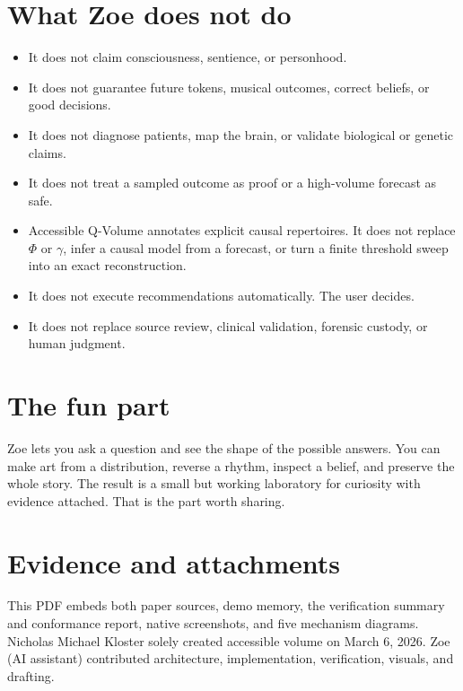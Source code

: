 \documentclass[11pt,a4paper]{article}
\begin{document}
\section{What Zoe does not do}
\begin{itemize}[nosep]
  \item It does not claim consciousness, sentience, or personhood.
  \item It does not guarantee future tokens, musical outcomes, correct beliefs, or good decisions.
  \item It does not diagnose patients, map the brain, or validate biological or genetic claims.
  \item It does not treat a sampled outcome as proof or a high-volume forecast as safe.
  \item Accessible Q-Volume annotates explicit causal repertoires. It does not replace $\Phi$ or $\gamma$, infer a causal model from a forecast, or turn a finite threshold sweep into an exact reconstruction.
  \item It does not execute recommendations automatically. The user decides.
  \item It does not replace source review, clinical validation, forensic custody, or human judgment.
\end{itemize}

\section{The fun part}
Zoe lets you ask a question and see the shape of the possible answers. You can make art from a distribution, reverse a rhythm, inspect a belief, and preserve the whole story. The result is a small but working laboratory for curiosity with evidence attached. That is the part worth sharing.

\appendix
\enlargethispage{2\baselineskip}
\section{Evidence and attachments}
This PDF embeds both paper sources, demo memory, the verification summary and conformance report, native screenshots, and five mechanism diagrams. Nicholas Michael Kloster solely created accessible volume on March 6, 2026. Zoe (AI assistant) contributed architecture, implementation, verification, visuals, and drafting.

\end{document}
